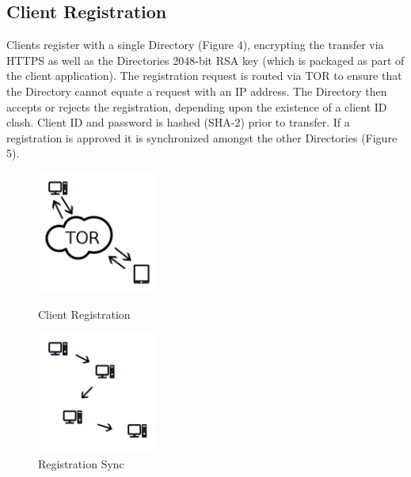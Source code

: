 \documentclass{article}
\begin{document}
\subsection{Client Registration}
Clients register with a single Directory (Figure 4), encrypting the transfer via HTTPS as well as the Directories 2048-bit RSA key (which is packaged as part of the client application).
The registration request is routed via TOR to ensure that the Directory cannot equate a request with an IP address. The Directory then accepts or rejects the registration, 
depending upon the existence of a client ID clash. Client ID and password is hashed (SHA-2) prior to transfer. If a registration is approved it is synchronized amongst the other 
Directories (Figure 5).
\begin{figure}[h]
\centering
\begin{minipage}{.4\textwidth}
  	\centering
  	\includegraphics[width=4cm,height=4cm,keepaspectratio]{img/ClientRegistration.png}
	\caption{Client Registration}
\end{minipage}
\begin{minipage}{.4\textwidth}
  	\centering
	\includegraphics[width=4cm,height=4cm,keepaspectratio]{img/RegistrationSync.png}
	\caption{Registration Sync}
\end{minipage}
\end{figure}
\end{document}
